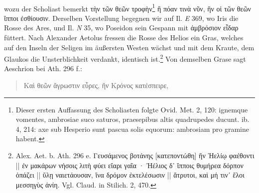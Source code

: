 \documentclass[a4paper, 11pt, oneside]{article}
\begin{document}
\paragraph{}
wozu der Scholiast bemerkt τὴν τῶν θεῶν τροφὴν\footnote{Dieser ersten Auffassung des Scholiasten folgte Ovid. Met. 2, 120: ignemque vomentes, ambrosiae suco saturos, praesepibus altis quadrupedes ducunt. ib. 4, 214: axe sub Hesperio sunt pascua solis equorum: ambrosiam pro gramine habent.} ἢ πόαν τινὰ νῦν, ἣν οἱ τῶν θεῶν ἵπποι ἐσθίουσιν. Derselben Vorstellung begegnen wir auf Il. \emph{E} 369, wo Iris die Rosse des Ares, und Il. \emph{N} 35, wo Poseidon sein Gespann mit ἀμβρόσιον εἶδαρ füttert. Nach Alexander Aetolus fressen die Rosse des Helios ein Gras, welches auf den Inseln der Seligen im äußersten Westen wächst und mit dem Kraute, dem Glaukos die Unsterblichkeit verdankt, identisch ist.\footnote{Alex. Aet. b. Ath. 296 e. Γευσάμενος βοτάνης [κατεποντώθη] ἣν Ἠελίῳ φαέθοντι || ἐν μακάρων νήσοις λιτὴ φύει εἴαρι γαῖα · Ἠέλιος δ᾽ ἵπποις θυμήρεα δόρπον ὁπάζει || ὕλῃ ναιετάουσαν, ἵνα δρόμον ἐκτελέσωσιν || ἄτρυτοι, καὶ μή τιν᾽ ἕλοι μεσσηγὺς ἀνίη. Vgl. Claud. in Stilich. 2, 470.} Von demselben Grase sagt Aeschrion bei Ath. 296 f.:
\begin{quotation}
Καὶ θεῶν ἄγρωστιν εὗρες, ἣν Κρόνος κατέσπειρε,
\end{quotation}
\end{document}

